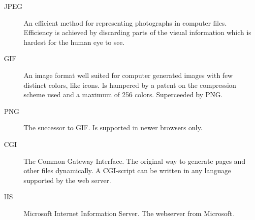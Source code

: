 \begin{description}
\item[JPEG] An efficient method for representing photographs in
  computer files.  Efficiency is achieved by discarding parts of the
  visual information which is hardest for the human eye to see.
\item[GIF] An image format well suited for computer generated images
  with few distinct colors, like icons.  Is hampered by a patent on
  the compression scheme used and a maximum of 256 colors.
  Superceeded by PNG.
\item[PNG] The successor to GIF.  Is supported in newer browsers
  only.  
\item[CGI] The Common Gateway Interface.  The original way to generate
  pages and other files dynamically.  A CGI-script can be written in
  any language supported by the web server.

\item[IIS] Microsoft Internet Information Server.  The webserver from
  Microsoft. 

\end{description}

  

    

